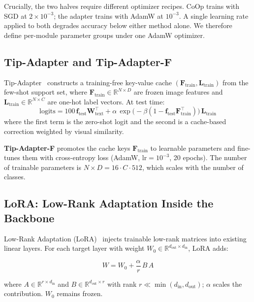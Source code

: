 \documentclass[10pt,twocolumn,letterpaper]{article}
\begin{document}
Crucially, the two halves require different optimizer recipes. CoOp trains with SGD at $2 \times 10^{-3}$; the adapter trains with AdamW at $10^{-3}$.  A single learning rate applied to both degrades accuracy below either method alone. We therefore define per-module parameter groups under one AdamW optimizer.


\subsection{Tip-Adapter and Tip-Adapter-F}\label{sec:tip}

Tip-Adapter~\cite{zhang2022tip} constructs a training-free key-value cache $(\mathbf{F}_{\mathrm{train}}, \mathbf{L}_{\mathrm{train}})$ from the few-shot support set, where $\mathbf{F}_{\mathrm{train}} \in
\mathbb{R}^{N \times D}$ are frozen image features and $\mathbf{L}_{\mathrm{train}} \in \mathbb{R}^{N \times C}$ are one-hot label vectors. At test time:
\begin{equation}\label{eq:tip}
  \mathrm{logits} = 100\,\mathbf{f}_{\mathrm{test}}
    \mathbf{W}_{\mathrm{text}}^\top
  + \alpha\,\exp\!\bigl(-\beta(1 - \mathbf{f}_{\mathrm{test}}
    \mathbf{F}_{\mathrm{train}}^\top)\bigr)\,\mathbf{L}_{\mathrm{train}}
\end{equation}
where the first term is the zero-shot logit and the second is a cache-based correction weighted by visual similarity.

\textbf{Tip-Adapter-F} promotes the cache keys $\mathbf{F}_{\mathrm{train}}$ to learnable parameters and fine-tunes them with cross-entropy loss (AdamW, $\mathrm{lr} = 10^{-3}$, 20 epochs).  The number of trainable parameters is $N \times D = 16 \cdot C \cdot 512$, which scales with the number of classes.


\subsection{LoRA: Low-Rank Adaptation Inside the Backbone}\label{sec:lora}

Low-Rank Adaptation (LoRA)~\cite{hu2022lora} injects trainable low-rank matrices into existing linear layers.  For each target layer with weight $W_0 \in \mathbb{R}^{d_{\mathrm{out}} \times d_{\mathrm{in}}}$, LoRA adds:

\begin{equation}\label{eq:lora}
  W = W_0 + \frac{\alpha}{r}\,B\,A
\end{equation}

where $A \in \mathbb{R}^{r \times d_{\mathrm{in}}}$ and $B \in \mathbb{R}^{d_{\mathrm{out}} \times r}$ with rank $r \ll
\min(d_{\mathrm{in}}, d_{\mathrm{out}})$; $\alpha$ scales the contribution. $W_0$ remains frozen.
\end{document}
